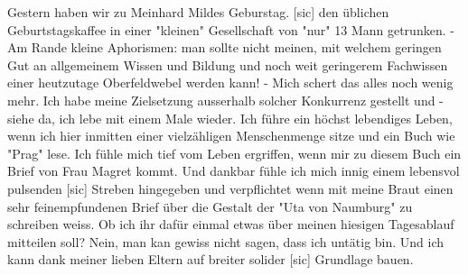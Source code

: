 \def\day{15. Dezember 1942}
\mktitle

Gestern haben wir zu Meinhard Mildes Geburstag.{\color{red} [sic] } den \"{u}blichen Geburtstagskaffee in einer "kleinen" Gesellschaft von "nur" 13 Mann getrunken.
- Am Rande kleine Aphorismen: man sollte nicht meinen, mit welchem geringen Gut an allgemeinem Wissen und Bildung und noch weit geringerem Fachwissen einer heutzutage Oberfeldwebel werden kann!
- Mich schert das alles noch wenig mehr.
Ich habe meine Zielsetzung ausserhalb solcher Konkurrenz gestellt und - siehe da, ich lebe mit einem Male wieder.
Ich f\"{u}hre ein h\"{o}chst lebendiges Leben, wenn ich hier inmitten einer vielz\"{a}hligen Menschenmenge sitze und ein Buch wie "Prag" lese.
Ich f\"{u}hle mich tief vom Leben ergriffen, wenn mir zu diesem Buch ein Brief von Frau Magret kommt.
Und dankbar f\"{u}hle ich mich innig einem lebensvol pulsenden{\color{red} [sic] } Streben hingegeben und verpflichtet wenn mit meine Braut einen sehr feinempfundenen Brief \"{u}ber die Gestalt der "Uta von Naumburg" zu schreiben weiss.
Ob ich ihr daf\"{u}r einmal etwas \"{u}ber meinen hiesigen Tagesablauf mitteilen soll?
Nein, man kan gewiss nicht sagen, dass ich unt\"{a}tig bin.
Und ich kann dank meiner lieben Eltern auf breiter solider{\color{red} [sic] } Grundlage bauen.

\clearpage
